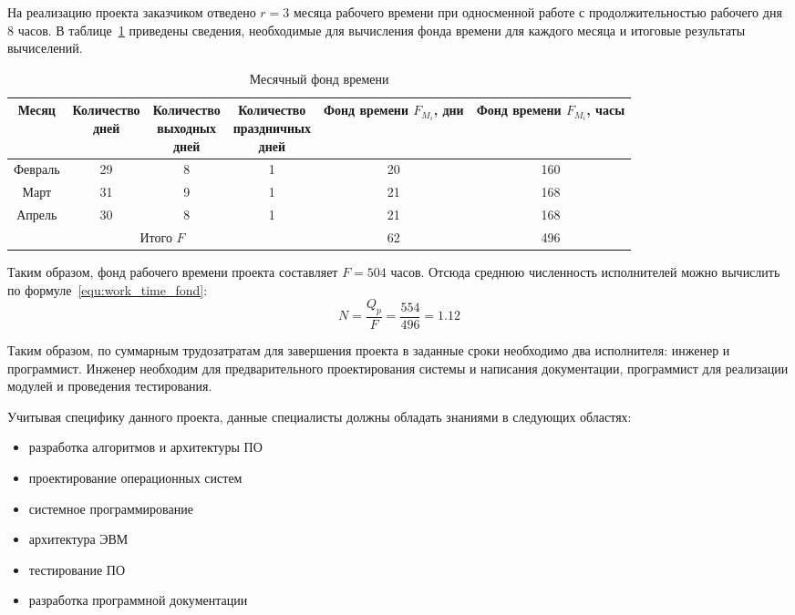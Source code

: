 На реализацию проекта заказчиком отведено $r = 3$ месяца рабочего времени при
односменной работе с продолжительностью рабочего дня 8 часов. В таблице~\ref{tab:month_time_fond}
приведены сведения, необходимые для вычисления фонда времени для каждого
месяца и итоговые результаты вычиселений.

\begin{table}[ht!]
  \centering
  \caption{Месячный фонд времени}
  \label{tab:month_time_fond}
  \begin{tabular}{|c|c|c|c|c|c|}
    \hline
	Месяц & \thead{Количество \\ дней} & \thead{Количество \\ выходных \\ дней} &
		\thead{Количество \\ праздничных \\ дней} & \thead{Фонд \\ времени \\ $F_{M_{i}}$, дни} &
		\thead{Фонд \\ времени \\ $F_{M_{i}}$, часы} \\
    \hline
	Февраль & 29 & 8 & 1 & 20 & 160 \\
    \hline
	Март & 31 & 9 & 1 & 21 & 168 \\
    \hline
	Апрель & 30 & 8 & 1 & 21 & 168 \\
    \hline
	\multicolumn{4}{|c|}{Итого $F$} & 62 & 496 \\
    \hline
  \end{tabular}
\end{table}

Таким образом, фонд рабочего времени проекта составляет $F = 504$ часов.
Отсюда среднюю численность исполнителей можно вычислить по формуле~\ref{equ:work_time_fond}:
\begin{equation}
	N = \frac{Q_{p}}{F} = \frac{554}{496} = 1.12
\label{equ:work_time_fond}
\end{equation}

Таким образом, по суммарным трудозатратам для завершения проекта в заданные
сроки необходимо два исполнителя: инженер и программист. Инженер необходим для
предварительного проектирования системы и написания документации, программист
для реализации модулей и проведения тестирования.

Учитывая специфику данного проекта, данные специалисты должны обладать
знаниями в следующих областях:
\begin{itemize}
\item разработка алгоритмов и архитектуры ПО
\item проектирование операционных систем
\item системное программирование
\item архитектура ЭВМ
\item тестирование ПО
\item разработка программной документации
\end{itemize}

